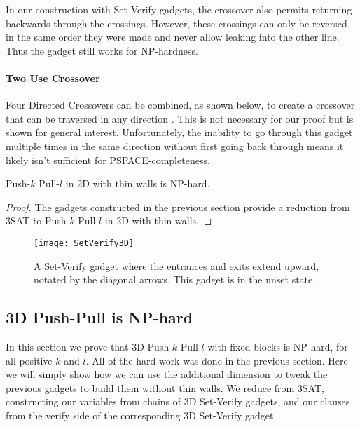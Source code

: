 In our construction with Set-Verify gadgets, the crossover also permits returning backwards through the crossings. However, these crossings can only be reversed in the same order they were made and never allow leaking into the other line. Thus the gadget still works for NP-hardness.

\paragraph{Two Use Crossover} 
Four Directed Crossovers can be combined, as shown below, to create a crossover that can be traversed in any direction \cite{Push100}. This is not necessary for our proof but is shown for general interest. Unfortunately, the inability to go through this gadget multiple times in the same direction without first going back through means it likely isn't sufficient for PSPACE-completeness. 

\begin{theorem}
\label{thm:2DNPhard}
Push-$k$ Pull-$l$ in 2D with thin walls is NP-hard.
\end{theorem}
\begin{proof}
The gadgets constructed in the previous section provide a reduction from 3SAT to Push-$k$ Pull-$l$ in 2D with thin walls.
\end{proof}

\begin{wrapfigure}{hr}{0.45\textwidth}
  \centering
    \texttt{[image: SetVerify3D]}
    \caption{A Set-Verify gadget where the entrances and exits extend upward, notated by the diagonal arrows. This gadget is in the unset state.}
    \label{3DSetVerify}
    \vspace{-5mm}
\end{wrapfigure}

\subsection{3D Push-Pull is NP-hard}
\label{3DNPhard}
In this section we prove that 3D Push-$k$ Pull-$l$ with fixed blocks is NP-hard, for all positive $k$ and $l$. All of the hard work was done in the previous section. Here we will simply show how we can use the additional dimension to tweak the previous gadgets to build them without thin walls. We reduce from 3SAT, constructing our variables from chains of 3D Set-Verify gadgets, and our clauses from the verify side of the corresponding 3D Set-Verify gadget.

